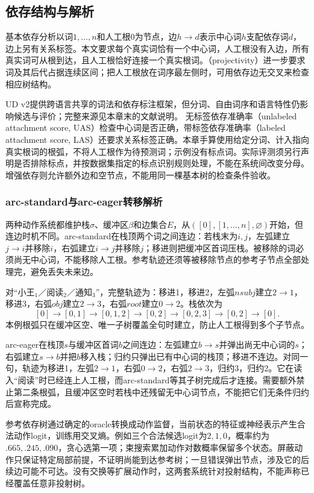 \subsection{依存结构与解析}
\label{sec:nlp-analysis-dependency}

基本依存分析以词$1,\ldots,n$和人工根0为节点，边$h\to d$表示中心词$h$支配依存词$d$，边上另有关系标签。本文要求每个真实词恰有一个中心词，人工根没有入边，所有真实词可从根到达，且人工根恰好连接一个真实根词。（projectivity）进一步要求词及其后代占据连续区间；把人工根放在词序最左侧时，可用依存边无交叉来检查相应树结构。

UD v2提供跨语言共享的词法和依存标注框架，但分词、自由词序和语言特性仍影响候选与评价；完整来源见本章末的文献说明。
无标签依存准确率（unlabeled attachment score, UAS）检查中心词是否正确，带标签依存准确率（labeled attachment score, LAS）还要求关系标签正确。本章手算使用给定分词、计入指向真实根词的根弧，不将人工根作为待预测词；示例没有标点词。实际评测须另行声明是否排除标点，并按数据集指定的标点识别规则处理，不能在系统间改变分母。增强依存则允许额外边和空节点，不能用同一棵基本树的检查条件验收。

\subsubsection{arc-standard与arc-eager转移解析}
\label{sec:nlp-analysis-arc-transition}

两种动作系统都维护栈$\sigma$、缓冲区$\beta$和边集合$E$，从$([0],[1,\ldots,n],\varnothing)$开始，但连边时机不同。arc-standard在栈顶两个词之间连边：若栈末为$i,j$，左弧建立$j\to i$并移除$i$，右弧建立$i\to j$并移除$j$；移进则把缓冲区首词压栈。被移除的词必须尚无中心词，不能移除人工根。参考轨迹还须等被移除节点的参考子节点全部处理完，避免丢失未来边。

对“小王$_1$／阅读$_2$／通知$_3$”，完整轨迹为：移进1，移进2，左弧$nsubj$建立$2\to1$，移进3，右弧$obj$建立$2\to3$，右弧$root$建立$0\to2$。栈依次为
\[
 [0]\to[0,1]\to[0,1,2]\to[0,2]
 \to[0,2,3]\to[0,2]\to[0].
\]
本例根弧只在缓冲区空、唯一子树覆盖全句时建立，防止人工根得到多个子节点。

arc-eager在栈顶$s$与缓冲区首词$b$之间连边：左弧建立$b\to s$并弹出尚无中心词的$s$；右弧建立$s\to b$并把$b$移入栈；归约只弹出已有中心词的栈顶；移进不连边。对同一句，轨迹为移进1，左弧$2\to1$，右弧$0\to2$，右弧$2\to3$，归约3，归约2。它在读入“阅读”时已经连上人工根，而arc-standard等其子树完成后才连接。需要额外禁止第二条根弧，且缓冲区空时若栈中还残留无中心词节点，不能把它们无条件归约后宣称完成。

参考依存树通过确定的oracle转换成动作监督，当前状态的特征或神经表示产生合法动作logit，训练用交叉熵。例如三个合法候选logit为$2,1,0$，概率约为$.665,.245,.090$，贪心选第一项；束搜索累加动作对数概率保留多个状态。屏蔽动作只保证特定局部前提，不证明尚能到达参考树；一旦错误弹出节点，涉及它的后续边可能不可达。没有交换等扩展动作时，这两套系统针对投射结构，不能声称已经覆盖任意非投射树。

